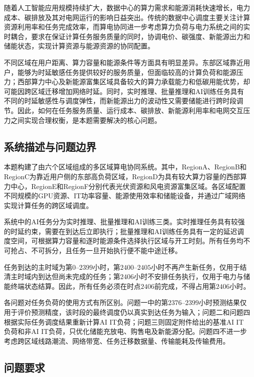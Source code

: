 \documentclass[UTF8,a4paper,zihao=-4]{ctexart}
\begin{document}
随着人工智能应用规模持续扩大，数据中心的算力需求和能源消耗快速增长，电力成本、碳排放及其对电网运行的影响日益突出\cite{邓维2013新能源,宋杰2018混合供电}。传统的数据中心调度主要关注计算资源利用率和任务完成效率，而算电协同进一步考虑算力负荷与电力系统之间的实时耦合，要求在保证计算任务服务质量的同时，协调电价、碳强度、新能源出力和储能状态，实现计算资源与能源资源的协同配置\cite{黄焱2016能耗费用}。

不同区域在用户距离、算力容量和能源条件等方面具有明显差异。东部区域靠近用户，能够为时延敏感任务提供较好的服务质量，但面临较高的计算负荷和能源压力；西部算力中心及新能源富集区域具备较大的算力承载能力和低碳用能优势，却可能因跨区域迁移增加网络时延。同时，实时推理、批量推理和AI训练任务具有不同的时延敏感性与调度弹性，而新能源出力的波动性又需要储能进行跨时段调节。因此，如何在任务服务质量、运行成本、碳排放、新能源利用率和电网交互压力之间实现合理权衡，是本题需要解决的核心问题。

\subsection{系统描述与问题边界}

本题构建了由六个区域组成的多区域算电协同系统。其中，RegionA、RegionB和RegionC为靠近用户侧的东部高负荷区域，RegionD为具有较大算力容量的西部算力中心，RegionE和RegionF分别代表光伏资源和风电资源富集区域。各区域配置不同规模的GPU资源、IT功率容量、能源使用效率和储能设备，并通过广域网络实现计算任务的跨区域调度。

系统中的AI任务分为实时推理、批量推理和AI训练三类。实时推理任务具有较强的时延约束，需要在到达后立即执行；批量推理和AI训练任务具有一定的延迟调度空间，可根据算力容量和逐时能源条件选择执行区域与开工时刻。所有任务均不可抢占、不可拆分，且任务一旦开始执行便不能中途迁移。

任务到达的主时域为第$0$--$2399$小时，第$2400$--$2405$小时不再产生新任务，仅用于结清主时域内到达但尚未完成的任务；第$2406$小时不安排任务执行，仅用于电力与储能终端状态结算。因此，所有任务必须在时点$2406$前完成，不得占用第$2406$小时。

各问题对任务负荷的使用方式有所区别。问题一中的第$2376$--$2399$小时预测结果仅用于评价预测精度，该时段的最终调度仍以真实到达任务为输入；问题二和问题四根据实际任务调度结果重新计算AI IT负荷；问题三则固定附件给出的基准AI IT负荷和非AI IT负荷，只优化储能充放电、购售电及新能源分配。问题四不进一步考虑跨区域线路潮流、网络带宽、任务迁移数据量、传输能耗及传输费用。

\subsection{问题要求}
\end{document}
